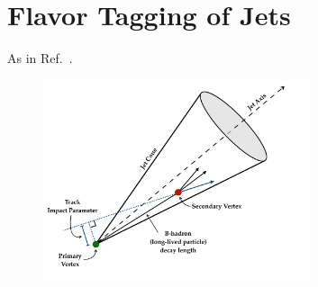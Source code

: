 \section{Flavor Tagging of Jets}
\label{sec:flavor_tagging}

As in Ref.~\cite{ATL-PHYS-PUB-2017-013}.

\begin{figure}[!htb]
    \begin{center}
        \includegraphics[width=0.7\textwidth]{figures/chapter3/ftag/bhadron_decayPDF}
        \caption{
        }
        \label{fig:bjet_decay}
    \end{center}
\end{figure}




\FloatBarrier
